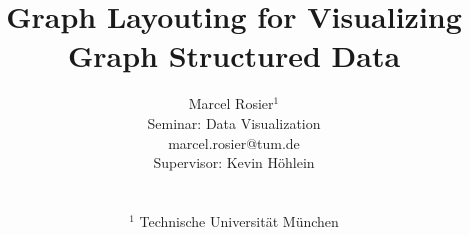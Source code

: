 

\title[Seminar Topic]%
      {Graph Layouting for Visualizing Graph Structured Data}

\author[M.Rosier \& K.\"ohlein]
{\parbox{\textwidth}{\centering Marcel Rosier$^1$%
\\ Seminar: Data Visualization %
\\ marcel.rosier@tum.de%
\\ Supervisor: Kevin H\"ohlein%
        }
        \\
{\parbox{\textwidth}{\centering $^1$ Technische Universit\"at M\"unchen
       }
}
}

%
\[\]




